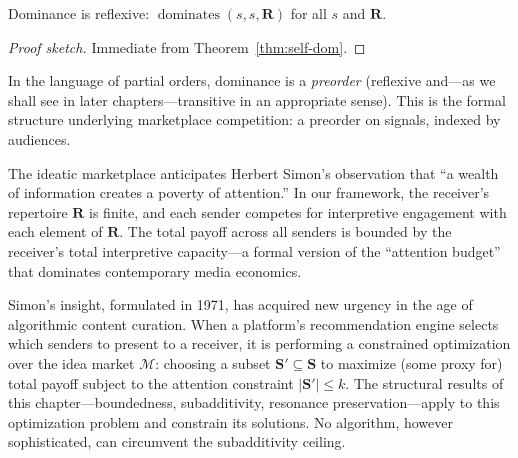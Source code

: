 \begin{theorem}
\label{thm:dom-refl}
Dominance is reflexive: $\operatorname{dominates}(s, s, \mathbf{R})$ for all $s$
and $\mathbf{R}$.
\end{theorem}

\begin{proof}[Proof sketch]
Immediate from Theorem~\ref{thm:self-dom}.
\end{proof}

In the language of partial orders, dominance is a \emph{preorder} (reflexive
and---as we shall see in later chapters---transitive in an appropriate sense).
This is the formal structure underlying marketplace competition: a preorder on
signals, indexed by audiences.

\begin{remark}
The ideatic marketplace anticipates Herbert Simon's observation that
``a wealth of information creates a poverty of attention.'' In our
framework, the receiver's repertoire $\mathbf{R}$ is finite, and each
sender competes for interpretive engagement with each element of
$\mathbf{R}$. The total payoff across all senders is bounded by the
receiver's total interpretive capacity---a formal version of the
``attention budget'' that dominates contemporary media economics.

Simon's insight, formulated in 1971, has acquired new urgency in the
age of algorithmic content curation.  When a platform's recommendation
engine selects which senders to present to a receiver, it is performing
a constrained optimization over the idea market $\mathcal{M}$: choosing
a subset $\mathbf{S}' \subseteq \mathbf{S}$ to maximize (some proxy for)
total payoff subject to the attention constraint $|\mathbf{S}'| \le k$.
The structural results of this chapter---boundedness, subadditivity,
resonance preservation---apply to this optimization problem and constrain
its solutions.  No algorithm, however sophisticated, can circumvent the
subadditivity ceiling.
\end{remark}

